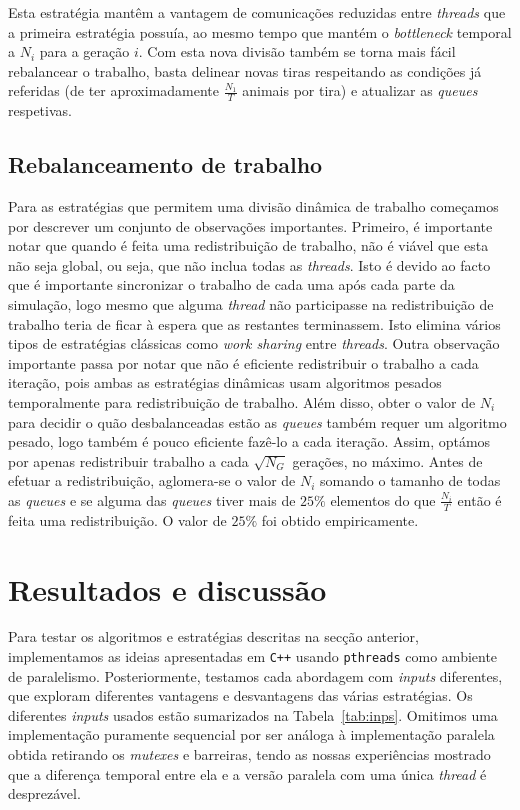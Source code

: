 \documentclass[10pt,a4paper,oneside]{article}
\begin{document}
Esta estratégia mantêm a vantagem de comunicações reduzidas entre
\textit{threads} que a primeira estratégia possuía, ao mesmo tempo que
mantém o \textit{bottleneck} temporal a $N_i$ para a geração $i$. Com
esta nova divisão também se torna mais fácil rebalancear o trabalho,
basta delinear novas tiras respeitando as condições já referidas (de
ter aproximadamente $\frac{N_1}{T}$ animais por tira) e atualizar as
\textit{queues} respetivas.

\subsection{Rebalanceamento de trabalho}
Para as estratégias que permitem uma divisão dinâmica de trabalho
começamos por descrever um conjunto de observações
importantes. Primeiro, é importante notar que quando é feita uma
redistribuição de trabalho, não é viável que esta não seja global, ou
seja, que não inclua todas as \textit{threads}. Isto é devido ao facto
que é importante sincronizar o trabalho de cada uma após cada parte da
simulação, logo mesmo que alguma \textit{thread} não participasse na
redistribuição de trabalho teria de ficar à espera que as restantes
terminassem. Isto elimina vários tipos de estratégias clássicas como
\textit{work sharing} entre \textit{threads}. Outra observação
importante passa por notar que não é eficiente redistribuir o trabalho
a cada iteração, pois ambas as estratégias dinâmicas usam algoritmos
pesados temporalmente para redistribuição de trabalho. Além disso,
obter o valor de $N_i$ para decidir o quão desbalanceadas estão as
\textit{queues} também requer um algoritmo pesado, logo também é pouco
eficiente fazê-lo a cada iteração. Assim, optámos por apenas
redistribuir trabalho a cada $\sqrt{N_G}$ gerações, no máximo. Antes
de efetuar a redistribuição, aglomera-se o valor de $N_i$ somando o
tamanho de todas as \textit{queues} e se alguma das \textit{queues}
tiver mais de $25\%$ elementos do que $\frac{N_i}{T}$ então é feita
uma redistribuição. O valor de $25\%$ foi obtido empiricamente.


\section{Resultados e discussão}
\label{sec:res}
Para testar os algoritmos e estratégias descritas na secção anterior,
implementamos as ideias apresentadas em \texttt{C++} usando
\texttt{pthreads} como ambiente de paralelismo. Posteriormente,
testamos cada abordagem com \textit{inputs} diferentes, que exploram
diferentes vantagens e desvantagens das várias estratégias. Os
diferentes \textit{inputs} usados estão sumarizados na
Tabela~\ref{tab:inps}. Omitimos uma implementação puramente sequencial
por ser análoga à implementação paralela obtida retirando os
\textit{mutexes} e barreiras, tendo as nossas experiências mostrado
que a diferença temporal entre ela e a versão paralela com uma única
\textit{thread} é desprezável.
\end{document}
